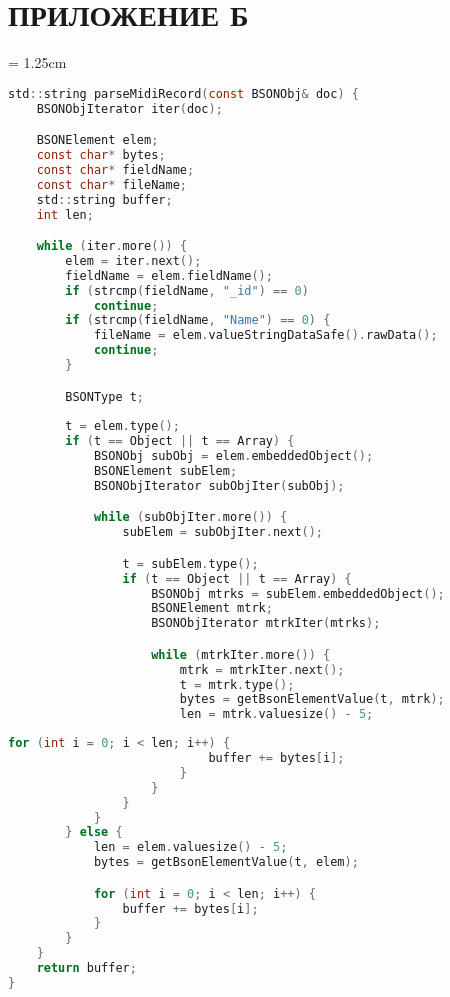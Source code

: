 \chapter{ПРИЛОЖЕНИЕ Б}
\parindent = 1.25cm
%
%

\begin{lstlisting}[language=C, label=some-code, caption=Метод записи документа MongoDB в MIDI-файл (часть 1), label=lst:file_builder1]
std::string parseMidiRecord(const BSONObj& doc) {
    BSONObjIterator iter(doc);

    BSONElement elem;
    const char* bytes;
    const char* fieldName;
    const char* fileName;
    std::string buffer;
    int len;

    while (iter.more()) {
        elem = iter.next();
        fieldName = elem.fieldName();
        if (strcmp(fieldName, "_id") == 0)
            continue;
        if (strcmp(fieldName, "Name") == 0) {
            fileName = elem.valueStringDataSafe().rawData();
            continue;
        }

        BSONType t;
        
        t = elem.type();
        if (t == Object || t == Array) {
            BSONObj subObj = elem.embeddedObject();
            BSONElement subElem;
            BSONObjIterator subObjIter(subObj);

            while (subObjIter.more()) {
                subElem = subObjIter.next();

                t = subElem.type();
                if (t == Object || t == Array) {
                    BSONObj mtrks = subElem.embeddedObject();
                    BSONElement mtrk;
                    BSONObjIterator mtrkIter(mtrks);

                    while (mtrkIter.more()) {
                        mtrk = mtrkIter.next();
                        t = mtrk.type();
                        bytes = getBsonElementValue(t, mtrk);
                        len = mtrk.valuesize() - 5;
\end{lstlisting}

\begin{lstlisting}[language=C, label=some-code, caption=Метод записи документа MongoDB в MIDI-файл (часть 2), label=lst:file_builder2]
                        for (int i = 0; i < len; i++) {
                            buffer += bytes[i];
                        }
                    }
                }
            }
        } else {
            len = elem.valuesize() - 5;
            bytes = getBsonElementValue(t, elem);

            for (int i = 0; i < len; i++) {
                buffer += bytes[i];
            }
        }
    }
    return buffer;
}
\end{lstlisting}

